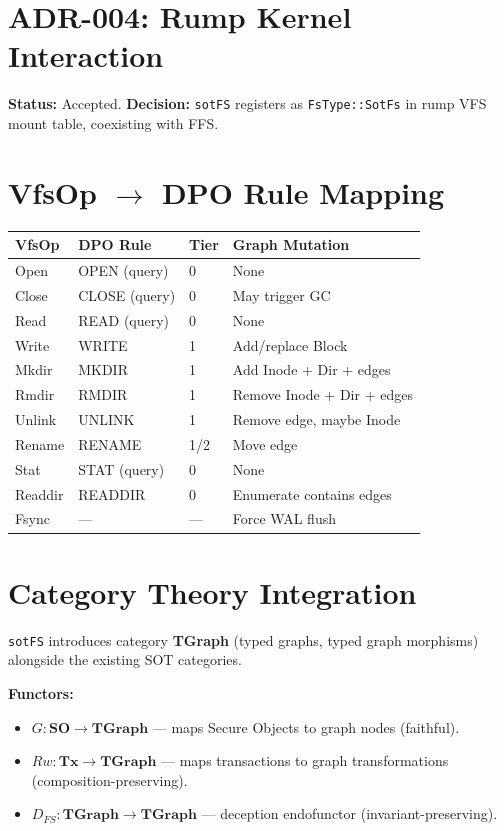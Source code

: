 \documentclass[11pt,a4paper,twoside]{report}
\theoremstyle{definition}
\newcommand{\sotFS}{\texttt{sotFS}}
\begin{document}
\chapter{ADR-004: Rump Kernel Interaction}
\textbf{Status:} Accepted. \textbf{Decision:} \sotFS{} registers as \texttt{FsType::SotFs} in rump VFS mount table, coexisting with FFS.

\appendix
\chapter{VfsOp $\to$ DPO Rule Mapping}

\begin{center}\small
\begin{tabular}{llll}
\toprule
\textbf{VfsOp} & \textbf{DPO Rule} & \textbf{Tier} & \textbf{Graph Mutation} \\
\midrule
Open    & OPEN (query)  & 0   & None \\
Close   & CLOSE (query) & 0   & May trigger GC \\
Read    & READ (query)  & 0   & None \\
Write   & WRITE         & 1   & Add/replace Block \\
Mkdir   & MKDIR         & 1   & Add Inode + Dir + edges \\
Rmdir   & RMDIR         & 1   & Remove Inode + Dir + edges \\
Unlink  & UNLINK        & 1   & Remove edge, maybe Inode \\
Rename  & RENAME        & 1/2 & Move edge \\
Stat    & STAT (query)  & 0   & None \\
Readdir & READDIR       & 0   & Enumerate contains edges \\
Fsync   & ---           & --- & Force WAL flush \\
\bottomrule
\end{tabular}
\end{center}

\chapter{Category Theory Integration}

\sotFS{} introduces category \textbf{TGraph} (typed graphs, typed graph morphisms) alongside the existing SOT categories.

\textbf{Functors:}
\begin{itemize}
\item $G: \mathbf{SO} \to \mathbf{TGraph}$ --- maps Secure Objects to graph nodes (faithful).
\item $Rw: \mathbf{Tx} \to \mathbf{TGraph}$ --- maps transactions to graph transformations (composition-preserving).
\item $D_{FS}: \mathbf{TGraph} \to \mathbf{TGraph}$ --- deception endofunctor (invariant-preserving).
\end{itemize}
\end{document}
